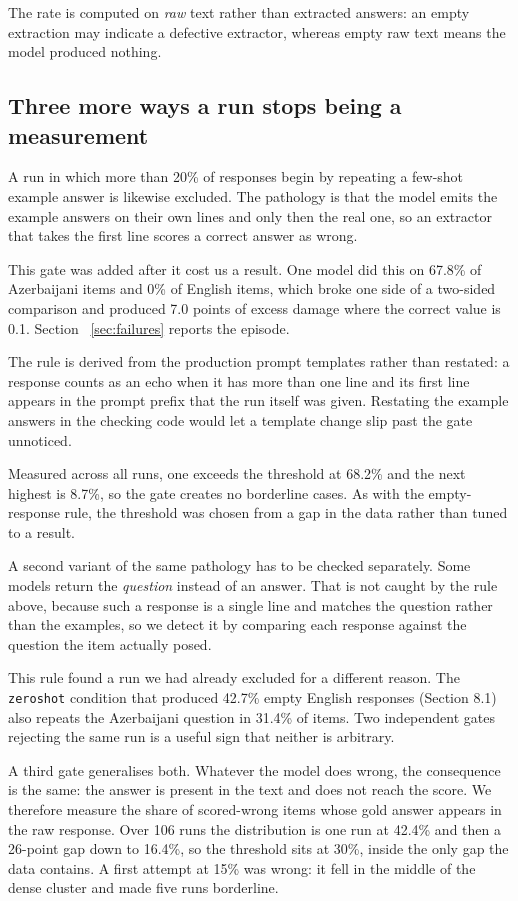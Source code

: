 \documentclass[final]{clv2025}
\begin{document}
The rate is computed on \emph{raw} text rather than extracted answers: an empty
extraction may indicate a defective extractor, whereas empty raw text means the
model produced nothing.

\subsection{Three more ways a run stops being a measurement}

A run in which more than 20\% of responses begin by repeating a few-shot
example answer is likewise excluded. The pathology is that the model emits the
example answers on their own lines and only then the real one, so an extractor
that takes the first line scores a correct answer as wrong.

This gate was added after it cost us a result. One model did this on 67.8\% of
Azerbaijani items and 0\% of English items, which broke one side of a two-sided
comparison and produced 7.0 points of excess damage where the correct value is
0.1. Section~
\ref{sec:failures} reports the episode.

The rule is derived from the production prompt templates rather than restated:
a response counts as an echo when it has more than one line and its first line
appears in the prompt prefix that the run itself was given. Restating the
example answers in the checking code would let a template change slip past the
gate unnoticed.

Measured across all runs, one exceeds the threshold at 68.2\% and the next
highest is 8.7\%, so the gate creates no borderline cases. As with the
empty-response rule, the threshold was chosen from a gap in the data rather
than tuned to a result.

A second variant of the same pathology has to be checked separately. Some
models return the \emph{question} instead of an answer. That is not caught by
the rule above, because such a response is a single line and matches the
question rather than the examples, so we detect it by comparing each response
against the question the item actually posed.

This rule found a run we had already excluded for a different reason. The
\texttt{zeroshot} condition that produced 42.7\% empty English responses
(Section 8.1) also repeats the Azerbaijani question in 31.4\% of items. Two
independent gates rejecting the same run is a useful sign that neither is
arbitrary.

A third gate generalises both. Whatever the model does wrong, the consequence
is the same: the answer is present in the text and does not reach the score. We
therefore measure the share of scored-wrong items whose gold answer appears in
the raw response. Over 106 runs the distribution is one run at 42.4\% and then
a 26-point gap down to 16.4\%, so the threshold sits at 30\%, inside the only
gap the data contains. A first attempt at 15\% was wrong: it fell in the middle
of the dense cluster and made five runs borderline.
\end{document}
